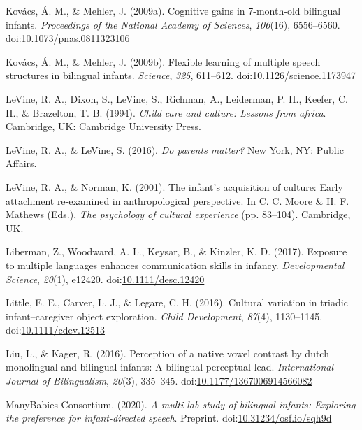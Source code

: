 \documentclass[,man,floatsintext]{apa6}
\begin{document}
\leavevmode\hypertarget{ref-Kovacs_Mehler_2009b}{}%
Kovács, Á. M., \& Mehler, J. (2009a). Cognitive gains in 7-month-old bilingual infants. \emph{Proceedings of the National Academy of Sciences}, \emph{106}(16), 6556--6560. doi:\href{https://doi.org/10.1073/pnas.0811323106}{10.1073/pnas.0811323106}

\leavevmode\hypertarget{ref-Kovacs_Mehler_2009a}{}%
Kovács, Á. M., \& Mehler, J. (2009b). Flexible learning of multiple speech structures in bilingual infants. \emph{Science}, \emph{325}, 611--612. doi:\href{https://doi.org/10.1126/science.1173947}{10.1126/science.1173947}

\leavevmode\hypertarget{ref-LeVine_etal_1994}{}%
LeVine, R. A., Dixon, S., LeVine, S., Richman, A., Leiderman, P. H., Keefer, C. H., \& Brazelton, T. B. (1994). \emph{Child care and culture: Lessons from africa}. Cambridge, UK: Cambridge University Press.

\leavevmode\hypertarget{ref-LeVine_LeVine_2016}{}%
LeVine, R. A., \& LeVine, S. (2016). \emph{Do parents matter?} New York, NY: Public Affairs.

\leavevmode\hypertarget{ref-LeVine_Norman_2001}{}%
LeVine, R. A., \& Norman, K. (2001). The infant's acquisition of culture: Early attachment re-examined in anthropological perspective. In C. C. Moore \& H. F. Mathews (Eds.), \emph{The psychology of cultural experience} (pp. 83--104). Cambridge, UK.

\leavevmode\hypertarget{ref-Liberman_etal_2017}{}%
Liberman, Z., Woodward, A. L., Keysar, B., \& Kinzler, K. D. (2017). Exposure to multiple languages enhances communication skills in infancy. \emph{Developmental Science}, \emph{20}(1), e12420. doi:\href{https://doi.org/10.1111/desc.12420}{10.1111/desc.12420}

\leavevmode\hypertarget{ref-Little_etal_2016}{}%
Little, E. E., Carver, L. J., \& Legare, C. H. (2016). Cultural variation in triadic infant--caregiver object exploration. \emph{Child Development}, \emph{87}(4), 1130--1145. doi:\href{https://doi.org/10.1111/cdev.12513}{10.1111/cdev.12513}

\leavevmode\hypertarget{ref-Liu_Kager_2016}{}%
Liu, L., \& Kager, R. (2016). Perception of a native vowel contrast by dutch monolingual and bilingual infants: A bilingual perceptual lead. \emph{International Journal of Bilingualism}, \emph{20}(3), 335--345. doi:\href{https://doi.org/10.1177/1367006914566082}{10.1177/1367006914566082}

\leavevmode\hypertarget{ref-ManyBabiesConsortium_2020}{}%
ManyBabies Consortium. (2020). \emph{A multi-lab study of bilingual infants: Exploring the preference for infant-directed speech}. Preprint. doi:\href{https://doi.org/10.31234/osf.io/sqh9d}{10.31234/osf.io/sqh9d}
\end{document}

